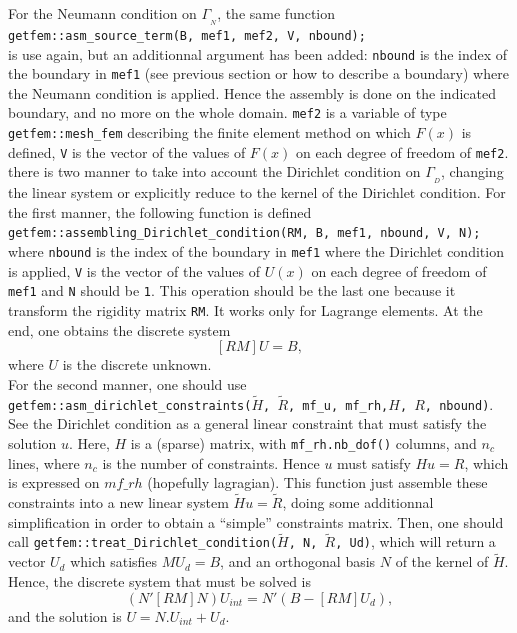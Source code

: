 \documentclass[11pt,a4paper]{article}
\begin{document}
For the Neumann condition on $\Gamma_{_N}$, the same function\\[0.5cm]
{\tt getfem::asm\_source\_term(B, mef1, mef2, V, nbound);} \\[0.5cm]
is use again, but an additionnal argument has been added: {\tt nbound} is the index of the boundary in {\tt mef1} (see previous section or how to describe a boundary) where the Neumann condition is applied. Hence the assembly is done on the indicated boundary, and no more on the whole domain. {\tt mef2}  is a variable of type {\tt getfem::mesh\_fem} describing the finite element method on which $F(x)$ is defined, {\tt V} is the vector of the values of $F(x)$ on each degree of freedom of {\tt mef2}.\\[0.5cm]
there is two manner to take into account the Dirichlet condition on $\Gamma_{_D}$, changing the linear system or explicitly reduce to the kernel of the Dirichlet condition. For the first manner, the following function is defined \\[0.5cm]
{\tt getfem::assembling\_Dirichlet\_condition(RM, B, mef1, nbound, V, N);} \\[0.5cm]
where {\tt nbound} is the index of the boundary in {\tt mef1} where the Dirichlet condition is applied, {\tt V} is the vector of the values of $U(x)$ on each degree of freedom of {\tt mef1} and {\tt N} should be {\tt 1}. This operation should be the last one because it transform the rigidity matrix {\tt RM}. It works only for Lagrange elements. At the end, one obtains the discrete system
$$ [RM] U = B, $$
where $U$ is the discrete unknown.\\[0.5cm]

For the second manner, one should use\\[0.5cm]
{\tt getfem::asm\_dirichlet\_constraints($\tilde{H}$, $\tilde{R}$, mf\_u, mf\_rh,$H$, $R$, nbound)}. See the Dirichlet condition as a general linear constraint that must satisfy the solution $u$. Here, $H$ is a (sparse) matrix, with {\tt mf\_rh.nb\_dof()} columns, and $n_c$ lines, where $n_c$ is the number of constraints. Hence $u$ must satisfy $Hu=R$, which is expressed on $mf\_rh$ (hopefully lagragian). This function just assemble these constraints into a new linear system $\tilde{H}u=\tilde{R}$, doing some additionnal simplification in order to obtain a ``simple'' constraints matrix.
Then, one should call {\tt getfem::treat\_Dirichlet\_condition($\tilde{H}$, N, $\tilde{R}$, Ud)}, which will return a vector $U_d$ which satisfies $MU_d=B$, and an orthogonal basis $N$ of the kernel of $\tilde{H}$. Hence, the discrete system that must be solved is 
$$ (N'[RM]N) U_{int}=N'(B-[RM]U_d),$$
and the solution is $U=N.U_{int}+U_d$.
\end{document}
